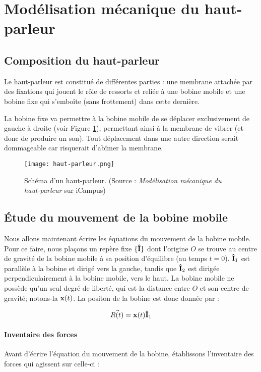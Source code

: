 

\section{Modélisation mécanique du haut-parleur}

\subsection{Composition du haut-parleur}
Le haut-parleur est constitué de différentes parties : une membrane
attachée par des fixations qui jouent le rôle de ressorts et reliée à 
une bobine mobile et une bobine fixe qui s'emboîte (sans frottement) 
dans cette dernière.

La bobine fixe va permettre à la bobine mobile de se déplacer exclusivement de gauche
à droite (voir Figure \ref{hp-scheme}), permettant ainsi à la membrane de vibrer 
(et donc de produire un son). Tout déplacement dans une autre direction serait dommageable
car risquerait d'abîmer la membrane.

\begin{figure}[ht!]
	\centering
	\texttt{[image: haut-parleur.png]}
	\caption{Schéma d'un haut-parleur. (Source : \textit{Modélisation mécanique du haut-parleur} sur iCampus)}
	\label{hp-scheme}
\end{figure}

\subsection{Étude du mouvement de la bobine mobile}
Nous allons maintenant écrire les équations du mouvement de la bobine mobile.
Pour ce faire, nous plaçons un repère fixe $\{{\bf\hat{I}}\}$ dont l'origine $O$ se trouve
au centre de gravité de la bobine mobile à sa position d'équilibre (au 
temps $t=0$). ${\bf\hat{ I}}_1$ est parallèle à la bobine et dirigé vers la gauche, tandis que
${\bf\hat{ I}}_2$ est dirigée perpendiculairement à la bobine mobile, vers le haut.
La bobine mobile ne possède qu'un seul degré de liberté, qui
est la distance entre $O$ et son centre de gravité; notons-la ${\bf x}(t)$.
La positon de la bobine est donc donnée par :

$$\vec{R(t)} = {\bf x}(t) {\bf\hat{ I}}_1$$ 

\paragraph{Inventaire des forces}
Avant d'écrire l'équation du mouvement de la bobine, établissons l'inventaire
des forces qui agissent sur celle-ci :

